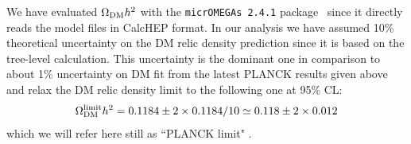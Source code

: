 \documentclass[12pt,a4paper]{article}
\begin{document}
We have evaluated $\Omega_{\rm DM} h^2$ with the
{\texttt{micrOMEGAs 2.4.1}} package~\cite{Belanger:2013oya,Belanger:2006is, Belanger:2010gh}
since it directly reads the model files in CalcHEP format.
{In our analysis we have assumed 10\% theoretical uncertainty  on the DM relic density prediction since it is based on the tree-level calculation. This uncertainty is the dominant one in comparison to about 1\% uncertainty on DM fit from the latest PLANCK results given above and relax the DM relic density limit 
to the following one at 95\% CL:
\begin{equation}
\Omega_{\rm DM}^{\rm limit} h^2=0.1184\pm 2\times 0.1184/10
\simeq 0.118\pm 2\times 0.012
\label{eq:planck-limit-relaxed}
\end{equation}
which we will refer here still as  ``PLANCK limit" .
}
\end{document}
